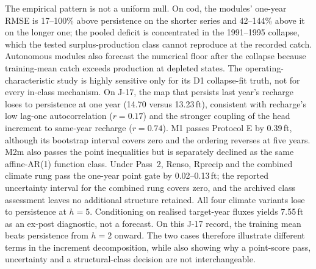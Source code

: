 \documentclass[preprint,11pt,authoryear]{elsarticle}
\theoremstyle{definition}
\theoremstyle{remark}
\begin{document}
The empirical pattern is not a uniform null. On cod, the modules' one-year RMSE is 17--100\% above persistence on the shorter series and 42--144\% above it on the longer one; the pooled deficit is concentrated in the 1991--1995 collapse, which the tested surplus-production class cannot reproduce at the recorded catch. Autonomous modules also forecast the numerical floor after the collapse because training-mean catch exceeds production at depleted states. The operating-characteristic study is highly sensitive only for its D1 collapse-fit truth, not for every in-class mechanism. On J-17, the map that persists last year's recharge loses to persistence at one year (14.70 versus 13.23\,ft), consistent with recharge's low lag-one autocorrelation ($r=0.17$) and the stronger coupling of the head increment to same-year recharge ($r=0.74$). M1 passes Protocol E by 0.39\,ft, although its bootstrap interval covers zero and the ordering reverses at five years. M2m also passes the point inequalities but is separately declined as the same affine-AR(1) function class. Under Pass~2, Renso, Rprecip and the combined climate rung pass the one-year point gate by 0.02--0.13\,ft; the reported uncertainty interval for the combined rung covers zero, and the archived class assessment leaves no additional structure retained. All four climate variants lose to persistence at $h=5$. Conditioning on realised target-year fluxes yields 7.55\,ft as an ex-post diagnostic, not a forecast. On this J-17 record, the training mean beats persistence from $h=2$ onward. The two cases therefore illustrate different terms in the increment decomposition, while also showing why a point-score pass, uncertainty and a structural-class decision are not interchangeable.
\end{document}
